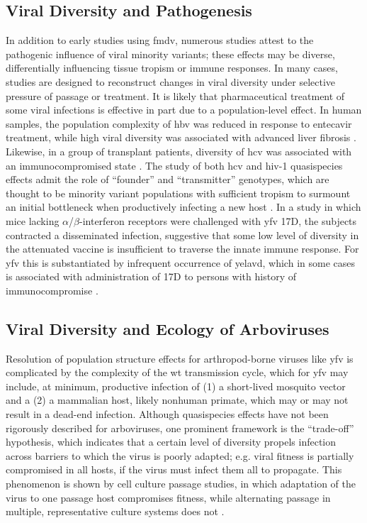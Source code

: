 \subsection{Viral Diversity and Pathogenesis}
In addition to early studies using \gls{fmdv}, numerous studies attest to the pathogenic influence of viral minority variants; these effects may be diverse, differentially influencing tissue tropism or immune responses. In many cases, studies are designed to reconstruct changes in viral diversity under selective pressure of passage or treatment. It is likely that pharmaceutical treatment of some viral infections is effective in part due to a population-level effect. In human samples, the population complexity of \gls{hbv} was reduced in response to entecavir treatment, while high viral diversity was associated with advanced liver fibrosis \parencite{Nishijima:2012ew}. Likewise, in a group of transplant patients, diversity of \gls{hcv} was associated with an immunocompromised state \parencite{Pessoa:1999gl}. The study of both \gls{hcv} and \gls{hiv}-1 quasispecies effects admit the role of ``founder'' and ``transmitter'' genotypes, which are thought to be minority variant populations with sufficient tropism to surmount an initial bottleneck when productively infecting a new host \parencite{Stoddard:2015bg}. In a study in which mice lacking $\alpha$/$\beta$-interferon receptors were challenged with \gls{yfv} 17D, the subjects contracted a disseminated infection, suggestive that some low level of diversity in the attenuated vaccine is insufficient to traverse the innate immune response. For \gls{yfv} this is substantiated by infrequent occurrence of \gls{yelavd}, which in some cases is associated with administration of 17D to persons with history of immunocompromise \parencite{Whittembury:2009hy,DeSilva:2015ww}.


\subsection{Viral Diversity and Ecology of Arboviruses}
Resolution of population structure effects for arthropod-borne viruses like \gls{yfv} is complicated by the complexity of the \gls{wt} transmission cycle, which for \gls{yfv} may include, at minimum, productive infection of (1) a short-lived mosquito vector and a (2) a mammalian host, likely nonhuman primate, which may or may not result in a dead-end infection. Although quasispecies effects have not been rigorously described for arboviruses, one prominent framework is the ``trade-off'' hypothesis, which indicates that a certain level of diversity propels infection across barriers to which the virus is poorly adapted; e.g. viral fitness is partially compromised in all hosts, if the virus must infect them all to propagate. This phenomenon is shown by cell culture passage studies, in which adaptation of the virus to one passage host compromises fitness, while alternating passage in multiple, representative  culture systems does not \parencite{Coffey:2008jqa}. 

